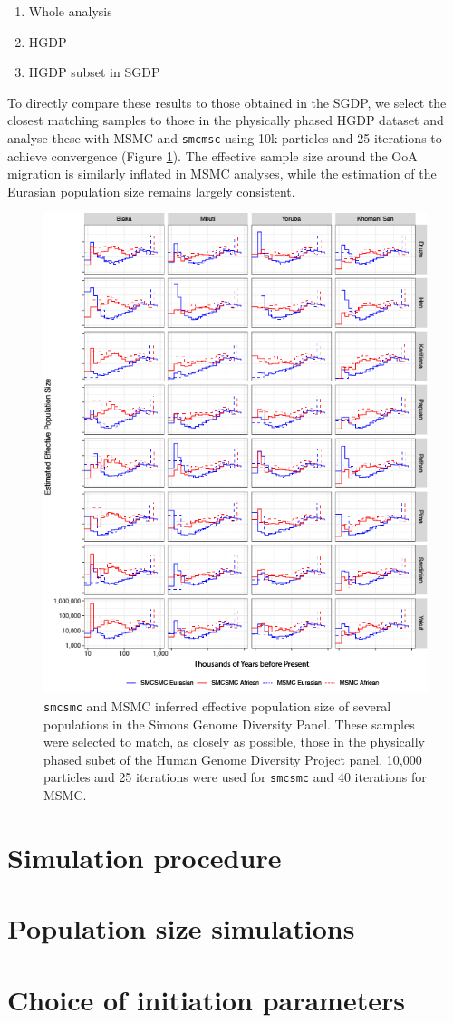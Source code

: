 \documentclass{article}
\begin{document}
\begin{enumerate}
    \item Whole analysis
    \item HGDP 
    \item HGDP subset in SGDP
\end{enumerate}

To directly compare these results to those obtained in the SGDP, we select the closest matching samples to those in the physically phased HGDP dataset and analyse these with MSMC and {\tt smcmsc} using 10k particles and 25 iterations to achieve convergence (Figure \ref{hgdp_sgdp_ne}). The effective sample size around the OoA migration is similarly inflated in MSMC analyses, while the estimation of the Eurasian population size remains largely consistent.  

\begin{figure}
    \centering
    \label{hgdp_sgdp_ne}
    \includegraphics[width=\linewidth]{../plot/sgdp_subset_ne.png}
    \caption{{\tt smcsmc} and MSMC inferred effective population size of several populations in the Simons Genome Diversity Panel. These samples were selected to match, as closely as possible, those in the physically phased subet of the Human Genome Diversity Project panel. 10,000 particles and 25 iterations were used for {\tt smcsmc} and 40 iterations for MSMC.}
\end{figure}

\section{Simulation procedure} \label{sim}
\section{Population size simulations} \label{ne}
\section{Choice of initiation parameters} \label{minit}
\end{document}
